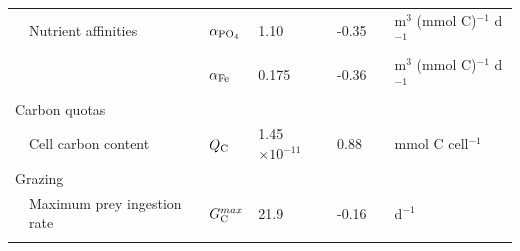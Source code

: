 \documentclass[gmd, manuscript]{copernicus}
\begin{document}
\begin{table}[htp!]
\begin{tabular*}{1.0\textwidth}{@{\extracolsep{\fill}}lllllll}
&Nutrient affinities			 & $\alpha_{\rm PO_4}$ & 1.10 & -0.35 & & m$^{3}$ (mmol C)$^{-1}$ d$^{-1}$ \\ 
& & $\alpha_{\rm Fe}$ & 0.175 & -0.36 & & m$^{3}$ (mmol C)$^{-1}$ d$^{-1}$ \\ 
\multicolumn{7}{l}{{Carbon quotas}} \\ 
&Cell carbon content & $Q_{\rm C}$ & 1.45$\times10^{-11}$ & 0.88 & & mmol C cell$^{-1}$ \\ 
\multicolumn{7}{l}{{Grazing}}\\
&Maximum prey ingestion rate & $G^{max}_{\rm C}$ & 21.9 & -0.16 & & d$^{-1}$ \\ 
\hline\\ [-1ex]
\end{tabular*}
\label{Size_dependent}
\end{table}


%


\end{document}
